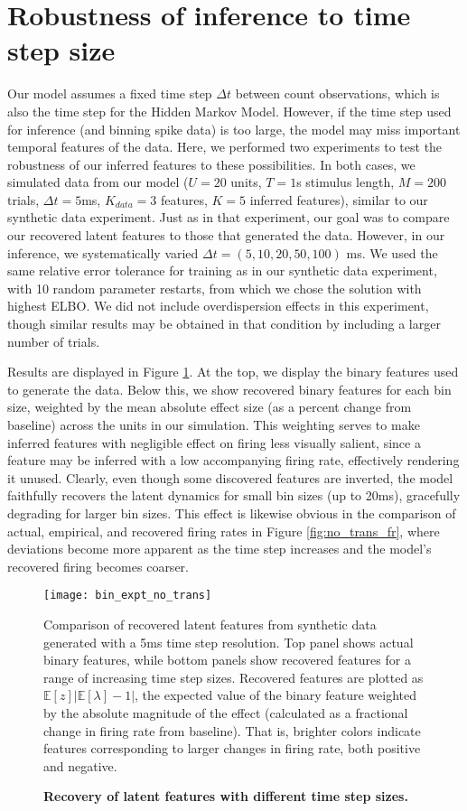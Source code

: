 \documentclass[10pt,letterpaper]{article}
\begin{document}
\section*{Robustness of inference to time step size}
Our model assumes a fixed time step $\Delta t$ between count observations, which is also the time step for the Hidden Markov Model. However, if the time step used for inference (and binning spike data) is too large, the model may miss important temporal features of the data. Here, we performed two experiments to test the robustness of our inferred features to these possibilities. In both cases, we simulated data from our model ($U=20$ units, $T=1$s stimulus length, $M=200$ trials, $\Delta t = 5$ms, $K_{data} = 3$ features, $K = 5$ inferred features), similar to our synthetic data experiment. Just as in that experiment, our goal was to compare our recovered latent features to those that generated the data. However, in our inference, we systematically varied $\Delta t = (5, 10, 20, 50, 100)$ ms. We used the same relative error tolerance for training as in our synthetic data experiment, with 10 random parameter restarts, from which we chose the solution with highest ELBO. We did not include overdispersion effects in this experiment, though similar results may be obtained in that condition by including a larger number of trials.

Results are displayed in Figure \ref{fig:no_trans}. At the top, we display the binary features used to generate the data. Below this, we show recovered binary features for each bin size, weighted by the mean absolute effect size (as a percent change from baseline) across the units in our simulation. This weighting serves to make inferred features with negligible effect on firing less visually salient, since a feature may be inferred with a low accompanying firing rate, effectively rendering it unused. Clearly, even though some discovered features are inverted, the model faithfully recovers the latent dynamics for small bin sizes (up to 20ms), gracefully degrading for larger bin sizes. This effect is likewise obvious in the comparison of actual, empirical, and recovered firing rates in Figure \ref{fig:no_trans_fr}, where deviations become more apparent as the time step increases and the model's recovered firing becomes coarser.


\begin{figure}[!ht]
    \texttt{[image: bin\_expt\_no\_trans]}
	\caption{\bf Recovery of latent features with different time step sizes.}
    Comparison of recovered latent features from synthetic data generated with a 5ms time step resolution. Top panel shows actual binary features, while bottom panels show recovered features for a range of increasing time step sizes. Recovered features are plotted as $\mathbb{E}[z] \lvert \mathbb{E}[\lambda] - 1 \rvert$, the expected value of the binary feature weighted by the absolute magnitude of the effect (calculated as a fractional change in firing rate from baseline). That is, brighter colors indicate features corresponding to larger changes in firing rate, both positive and negative.
	\label{fig:no_trans}
\end{figure}
\end{document}
